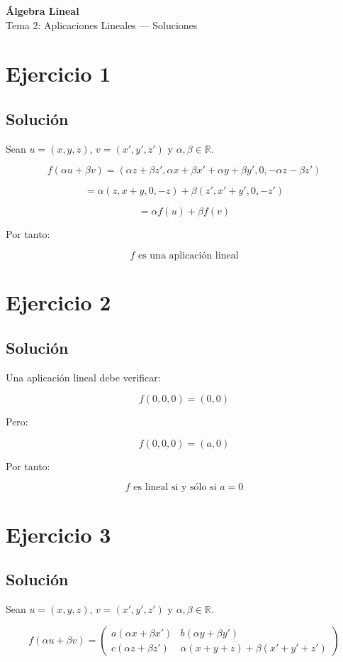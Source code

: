 \documentclass[11pt,a4paper]{article}
\newcommand{\R}{\mathbb{R}}
\begin{document}
\begin{center}
	{\LARGE\bfseries Álgebra Lineal}\\[0.4em]
	{\Large Tema 2: Aplicaciones Lineales --- Soluciones}
\end{center}

\section{Ejercicio 1}
	\subsection{Solución}

	Sean $u=(x,y,z)$, $v=(x',y',z')$ y $\alpha,\beta\in\R$.

	\[
	f(\alpha u+\beta v)
	=
	(\alpha z+\beta z',
	\alpha x+\beta x'+\alpha y+\beta y',
	0,
	-\alpha z-\beta z')
	\]

	\[
	=
	\alpha(z,x+y,0,-z)
	+
	\beta(z',x'+y',0,-z')
	\]

	\[
	=
	\alpha f(u)+\beta f(v)
	\]

	Por tanto:

	\[
	\boxed{
	f\text{ es una aplicación lineal}
	}
	\]

\section{Ejercicio 2}
	\subsection{Solución}

	Una aplicación lineal debe verificar:

	\[
	f(0,0,0)=(0,0)
	\]

	Pero:

	\[
	f(0,0,0)=(a,0)
	\]

	Por tanto:

	\[
	\boxed{
	f\text{ es lineal si y sólo si }a=0
	}
	\]

\section{Ejercicio 3}
	\subsection{Solución}

	Sean $u=(x,y,z)$, $v=(x',y',z')$ y $\alpha,\beta\in\R$.

	\[
	f(\alpha u+\beta v)
	=
	\begin{pmatrix}
	a(\alpha x+\beta x')&
	b(\alpha y+\beta y')\\
	c(\alpha z+\beta z')&
	\alpha(x+y+z)+\beta(x'+y'+z')
	\end{pmatrix}
	\]
\end{document}
